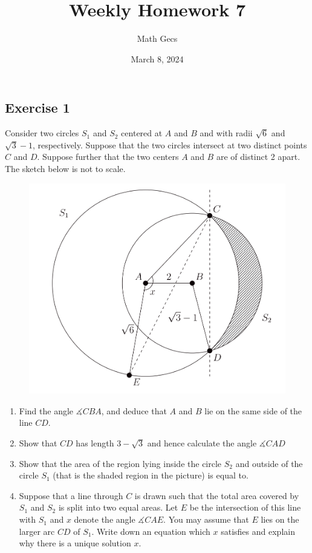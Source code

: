 \documentclass[12pt]{article}
\title{Weekly Homework 7}
\author{Math Gecs}
\date{March 8, 2024}
\renewcommand{\angle}{\measuredangle}
\begin{document}
\maketitle

\subsection*{Exercise 1}
Consider two circles $S_1$ and $S_2$ centered at $A$ and $B$ and with radii $\sqrt{6}$ and $\sqrt{3} - 1$, respectively. Suppose that the two circles intersect at two distinct points $C$ and $D$. Suppose further that the two centers $A$ and $B$ are of distinct 2 apart. The sketch below is not to scale.


\begin{figure}[H]
        \centering
        \includegraphics[width=12cm]{oxford_mat.png}
        \label{fig:oxford-MAT}
    \end{figure}

\begin{enumerate}[i]
    \item Find the angle $\angle CBA$, and deduce that $A$ and $B$ lie on the same side of the line $CD$.

    \item Show that $CD$ has length $3 - \sqrt{3}$ and hence calculate the angle $\measuredangle CAD$

    \item Show that the area of the region lying inside the circle $S_2$ and outside of the circle $S_1$ (that is the shaded region in the picture) is equal to.

    \item Suppose that a line through $C$ is drawn such that the total area covered by $S_1$ and $S_2$ is split into two equal areas. Let $E$ be the intersection of this line with $S_1$ and $x$ denote the angle $\angle CAE$. You may assume that $E$ lies on the larger arc $CD$ of $S_1$. Write down an equation which $x$ satisfies and explain why there is a unique solution $x$.
    
    \end{enumerate}
\end{document}
